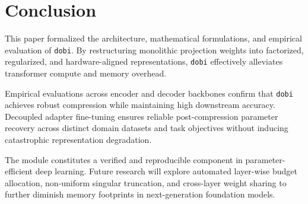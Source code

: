\section{Conclusion}
This paper formalized the architecture, mathematical formulations, and empirical evaluation of \texttt{dobi}. By restructuring monolithic projection weights into factorized, regularized, and hardware-aligned representations, \texttt{dobi} effectively alleviates transformer compute and memory overhead.

Empirical evaluations across encoder and decoder backbones confirm that \texttt{dobi} achieves robust compression while maintaining high downstream accuracy. Decoupled adapter fine-tuning ensures reliable post-compression parameter recovery across distinct domain datasets and task objectives without inducing catastrophic representation degradation.

The module constitutes a verified and reproducible component in parameter-efficient deep learning. Future research will explore automated layer-wise budget allocation, non-uniform singular truncation, and cross-layer weight sharing to further diminish memory footprints in next-generation foundation models.
